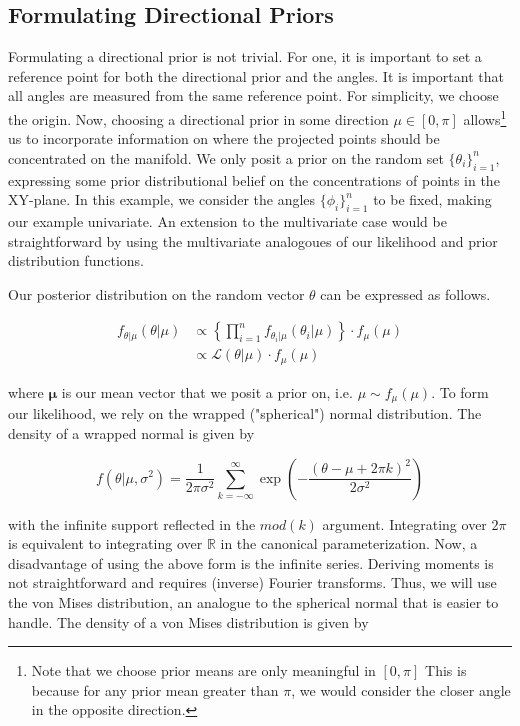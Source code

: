 \documentclass[twoside,11pt]{article}
\begin{document}
\subsection{Formulating Directional Priors}

Formulating a directional prior is not trivial. For one, it is important to set a reference point for both the directional prior and the angles. It is important that all angles are measured from the same reference point. For simplicity, we choose the origin. Now, choosing a directional prior in some direction $\mu \in [0, \pi]$ allows\footnote{Note that we choose prior means are only meaningful in $[0, \pi]$ This is because for any prior mean greater than $\pi$, we would consider the closer angle in the opposite direction.} us to incorporate information on where the projected points should be concentrated on the manifold. We only posit a prior on the random set $\{\theta_i\}_{i=1}^n$, expressing some prior distributional belief on the concentrations of points in the XY-plane. In this example, we consider the angles $\{\phi_i\}_{i=1}^n$ to be fixed, making our example univariate. An extension to the multivariate case would be straightforward by using the multivariate analogoues of our likelihood and prior distribution functions. 

Our posterior distribution on the random vector $\theta$ can be expressed as follows. 

\[
\begin{aligned}
  f_{\theta | \mu} (\theta | \mu) 
  &\propto \left\{ \prod_{i=1}^n f_{\theta_i | \mu}(\theta_i | \mu) \right\} \cdot f_{\mu}(\mu) \\ 
  &\propto \mathcal{L}(\theta | \mu) \cdot f_{\mu}(\mu) 
\end{aligned}
\]

where $\boldsymbol{\mu}$ is our mean vector that we posit a prior on, i.e. $\mu \sim f_{\mu}(\mu)$. To form our likelihood, we rely on the wrapped ("spherical") normal distribution. The density of a wrapped normal is given by 

$$
f(\theta|\mu,\sigma^2) = 
\frac{1}{2\pi\sigma^2} \sum_{k=-\infty}^{\infty} \exp\left(-\frac{(\theta-\mu+2\pi k)^2}{2\sigma^2}\right)
$$

with the infinite support reflected in the $\mathit{mod}(k)$ argument. Integrating over $2\pi$ is equivalent to integrating over $\mathbb{R}$ in the canonical parameterization. Now, a disadvantage of using the above form is the infinite series. Deriving moments is not straightforward and requires (inverse) Fourier transforms. Thus, we will use the von Mises distribution, an analogue to the spherical normal that is easier to handle. The density of a von Mises distribution is given by 
\end{document}
